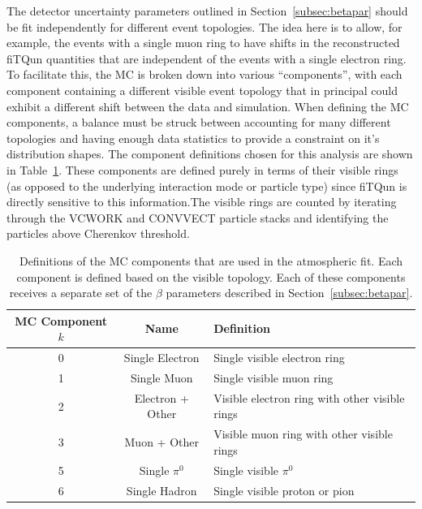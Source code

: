 The detector uncertainty parameters outlined in Section~\ref{subsec:betapar}
should be fit independently for different event topologies. The idea here is to
allow, for example, the events with a single muon ring to have shifts in the
reconstructed fiTQun quantities that are independent of the events with a
single electron ring.  To facilitate this, the MC is broken down into various
``components'', with each component containing a different visible event
topology that in principal could exhibit a different shift between the data and
simulation.  When defining the MC components, a balance must be struck between
accounting for many different topologies and having enough data statistics to
provide a constraint on it's distribution shapes.  The component definitions
chosen for this analysis are shown in Table~\ref{tab:components}.  These
components are defined purely in terms of their visible rings (as opposed to
the underlying interaction mode or particle type) since fiTQun is directly
sensitive to this information.The visible rings are counted by iterating
through the VCWORK and CONVVECT particle stacks and identifying the particles
above Cherenkov threshold.

\begin{table}
  \centering
  \begin{tabular}{c | c | l }
    \hline\hline
    MC Component $k$ & Name & Definition \\
    \hline
    0 & Single Electron & Single visible electron ring \\
    1 & Single Muon & Single visible muon ring  \\
    2 & Electron + Other & Visible electron ring with other visible rings  \\
    3 & Muon + Other & Visible muon ring with other visible rings  \\
    5 & Single $\pi^{0}$ & Single visible $\pi^{0}$  \\
    6 & Single Hadron &Single visible proton or pion  \\
    \hline\hline
  \end{tabular}
  \caption{Definitions of the MC components that are used in the atmospheric
  fit.  Each component is defined based on the visible topology. Each of these
  components receives a separate set of the $\beta$ parameters described in
  Section~\ref{subsec:betapar}. }
  \label{tab:components}
\end{table}



